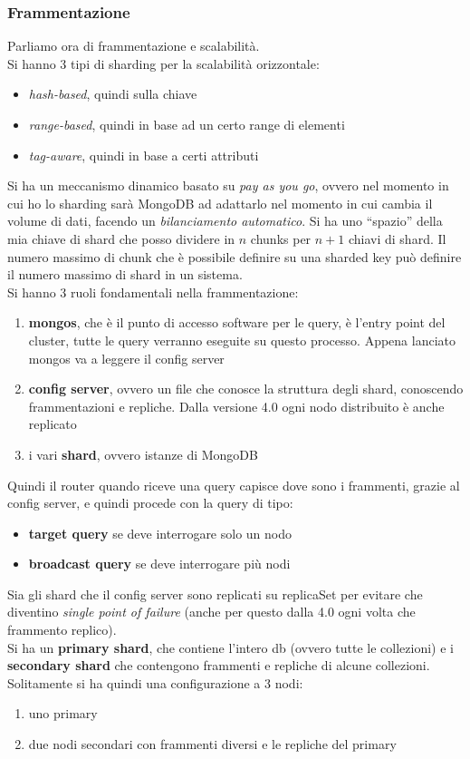 \documentclass[a4paper,12pt, oneside]{book}
\begin{document}
\subsubsection{Frammentazione}
Parliamo ora di frammentazione e scalabilità.\\
Si hanno 3 tipi di sharding per la scalabilità orizzontale:
\begin{itemize}
  \item \textit{hash-based}, quindi sulla chiave
  \item \textit{range-based}, quindi in base ad un certo range di elementi
  \item \textit{tag-aware}, quindi in base a certi attributi
\end{itemize}
Si ha un meccanismo dinamico basato su \textit{pay as you go}, ovvero nel
momento in cui ho lo sharding sarà MongoDB ad adattarlo nel momento in cui
cambia il volume di dati, facendo un \textit{bilanciamento automatico}. Si ha
uno ``spazio'' della mia chiave di shard che posso dividere in $n$ chunks per
$n+1$ chiavi di shard. Il numero massimo di chunk che è possibile definire su
una sharded key può definire il numero massimo di shard in un sistema.\\
Si hanno 3 ruoli fondamentali nella frammentazione:
\begin{enumerate}
  \item \textbf{mongos}, che è il punto di accesso software per le query, è
  l'entry point del cluster, tutte le query verranno eseguite su questo
  processo. Appena lanciato mongos va a leggere il config server
  
  \item \textbf{config server}, ovvero un file che conosce la struttura degli
  shard, conoscendo frammentazioni e repliche. Dalla versione 4.0 ogni nodo
  distribuito è anche replicato
  \item i vari \textbf{shard}, ovvero istanze di MongoDB
\end{enumerate}
Quindi il router quando riceve una query capisce dove sono i frammenti, grazie
al config server, e quindi procede con la query di tipo:
\begin{itemize}
  \item \textbf{target query} se deve interrogare solo un nodo
  \item \textbf{broadcast query} se deve interrogare più nodi
\end{itemize}
Sia gli shard che il config server sono replicati su replicaSet per evitare che
diventino \textit{single point of failure} (anche per questo dalla 4.0 ogni
volta che frammento replico).\\
Si ha un \textbf{primary shard}, che contiene l'intero db (ovvero tutte le
collezioni) e i \textbf{secondary shard} che contengono frammenti e repliche di
alcune collezioni. Solitamente si ha quindi una configurazione a 3 nodi:
\begin{enumerate}
  \item uno primary
  \item due nodi secondari con frammenti diversi e le repliche del primary
\end{enumerate}
\end{document}
